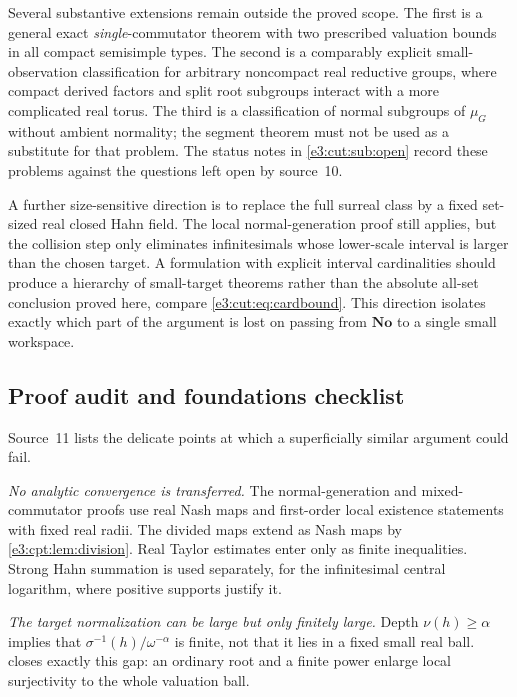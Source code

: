 \documentclass[11pt,letterpaper]{article}
\numberwithin{equation}{section}
\theoremstyle{definition}
\theoremstyle{remark}
\newcommand{\No}{\mathbf{No}}
\begin{document}
Several substantive extensions remain outside the proved scope. The first is a
general exact \emph{single}-commutator theorem with two prescribed valuation
bounds in all compact semisimple types. The second is a comparably explicit
small-observation classification for arbitrary noncompact real reductive
groups, where compact derived factors and split root subgroups interact with a
more complicated real torus. The third is a classification of normal subgroups
of $\mu_G$ without ambient normality; the segment theorem must not be used as
a substitute for that problem. The status notes in \cref{e3:cut:sub:open}
record these problems against the questions left open by source~10.

A further size-sensitive direction is to replace the full surreal class by a
fixed set-sized real closed Hahn field. The local normal-generation proof still
applies, but the collision step only eliminates infinitesimals whose lower-scale
interval is larger than the chosen target. A formulation with explicit interval
cardinalities should produce a hierarchy of small-target theorems rather than
the absolute all-set conclusion proved here, compare \cref{e3:cut:eq:cardbound}.
This direction isolates exactly which part of the argument is lost on passing
from $\No$ to a single small workspace.

\subsection{Proof audit and foundations checklist}\label{e3:cpt:sub:audit}

Source~11 lists the delicate points at which a superficially similar argument
could fail.

\emph{No analytic convergence is transferred.} The normal-generation and
mixed-commutator proofs use real Nash maps and first-order local existence
statements with fixed real radii. The divided maps extend as Nash maps by
\cref{e3:cpt:lem:division}. Real Taylor estimates enter only as finite
inequalities. Strong Hahn summation is used separately, for the infinitesimal
central logarithm, where positive supports justify it.

\emph{The target normalization can be large but only finitely large.} Depth
$\nu(h)\ge\alpha$ implies that $\sigma^{-1}(h)/\omega^{-\alpha}$ is finite, not
that it lies in a fixed small real ball.  closes
exactly this gap: an ordinary root and a finite power enlarge local
surjectivity to the whole valuation ball.
\end{document}
